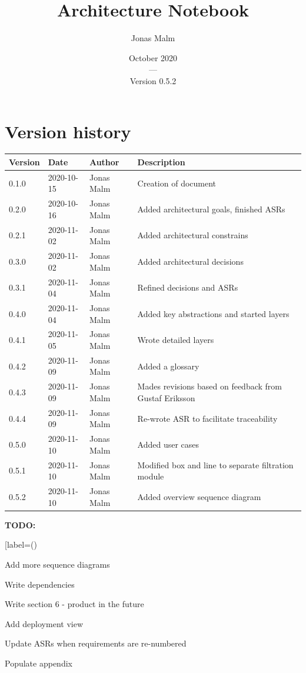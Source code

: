 \documentclass{article}
\title{Architecture Notebook}
\author{Jonas Malm}
\date{October 2020\\---\\Version 0.5.2}
\begin{document}
\maketitle
\clearpage

\begin{table}
\section*{Version history}
\centering
\begin{tabular}{|l|l|l|l|}
\hline
Version & Date & Author & Description \\ \hline
0.1.0 & 2020-10-15 & Jonas Malm & Creation of document\\ 
0.2.0 & 2020-10-16 & Jonas Malm & Added architectural goals, finished ASRs\\
0.2.1 & 2020-11-02 & Jonas Malm & Added architectural constrains\\ 
0.3.0 & 2020-11-02 & Jonas Malm & Added architectural decisions\\
0.3.1 & 2020-11-04 & Jonas Malm & Refined decisions and ASRs\\
0.4.0 & 2020-11-04 & Jonas Malm & Added key abstractions and started layers\\
0.4.1 & 2020-11-05 & Jonas Malm & Wrote detailed layers\\
0.4.2 & 2020-11-09 & Jonas Malm & Added a glossary\\
0.4.3 & 2020-11-09 & Jonas Malm & Mades revisions based on feedback from Gustaf Eriksson\\
0.4.4 & 2020-11-09 & Jonas Malm & Re-wrote ASR to facilitate traceability\\
0.5.0 & 2020-11-10 & Jonas Malm & Added user cases\\
0.5.1 & 2020-11-10 & Jonas Malm & Modified box and line to separate filtration module\\
0.5.2 & 2020-11-10 & Jonas Malm & Added overview sequence diagram\\

\hline
\end{tabular}
\end{table}
\textbf{TODO:}
\begin{enumerate}[label=(\roman*)
\item Add more sequence diagrams
\item Write dependencies
\item Write section 6 - product in the future
\item Add deployment view
\item Update ASRs when requirements are re-numbered
\item Populate appendix
\end{enumerate}
\end{document}
